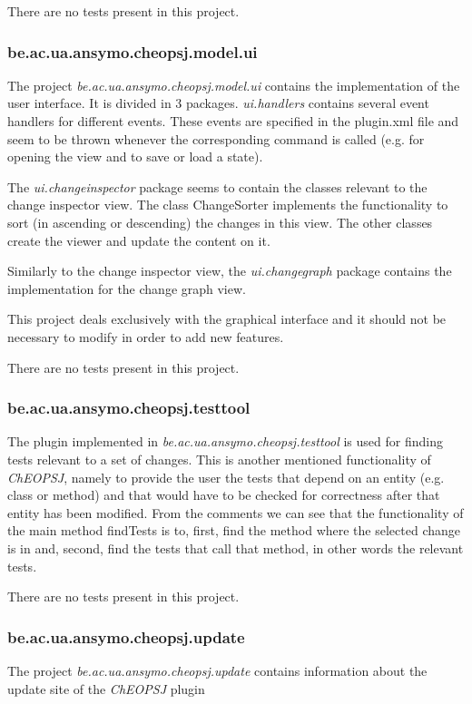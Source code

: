 \documentclass{article}
\begin{document}
There are no tests present in this project.

\subsubsection{be.ac.ua.ansymo.cheopsj.model.ui}
The project \emph{be.ac.ua.ansymo.cheopsj.model.ui} contains the implementation of the user interface. It is divided in 3 packages. \emph{ui.handlers} contains several event handlers for different events. These events are specified in the plugin.xml file and seem to be thrown whenever the corresponding command is called (e.g. for opening the view and to save or load a state).

The \emph{ui.changeinspector} package seems to contain the classes relevant to the change inspector view. The class ChangeSorter implements the functionality to sort (in ascending or descending) the changes in this view. The other classes create the viewer and update the content on it. 

Similarly to the change inspector view, the \emph{ui.changegraph} package contains the implementation for the change graph view.

This project deals exclusively with the graphical interface and it should not be necessary to modify in order to add new features.

There are no tests present in this project.

\subsubsection{be.ac.ua.ansymo.cheopsj.testtool}
The plugin implemented in \emph{be.ac.ua.ansymo.cheopsj.testtool} is used for finding tests relevant to a set of changes. This is another mentioned functionality of \emph{ChEOPSJ}, namely to provide the user the tests that depend on an entity (e.g. class or method) and that would have to be checked for correctness after that entity has been modified. From the comments we can see that the functionality of the main method findTests is to, first, find the method where the selected change is in and, second, find the tests that call that method, in other words the relevant tests.

There are no tests present in this project.

\subsubsection{be.ac.ua.ansymo.cheopsj.update}
The project \emph{be.ac.ua.ansymo.cheopsj.update} contains information about the update site of the \emph{ChEOPSJ} plugin
\end{document}
